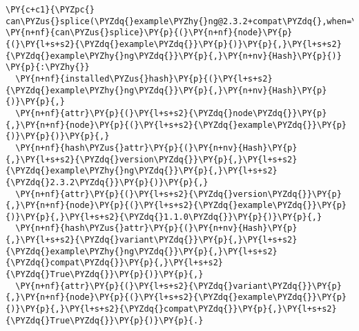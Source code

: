 \begin{Verbatim}[commandchars=\\\{\},fontsize=\footnotesize]
\PY{c+c1}{\PYZpc{} can\PYZus{}splice(\PYZdq{}example\PYZhy{}ng@2.3.2+compat\PYZdq{},when=\PYZdq{}@1.1.0+compat)}
\PY{n+nf}{can\PYZus{}splice}\PY{p}{(}\PY{n+nf}{node}\PY{p}{(}\PY{l+s+s2}{\PYZdq{}example\PYZdq{}}\PY{p}{)}\PY{p}{,}\PY{l+s+s2}{\PYZdq{}example\PYZhy{}ng\PYZdq{}}\PY{p}{,}\PY{n+nv}{Hash}\PY{p}{)} \PY{p}{:\PYZhy{}}
  \PY{n+nf}{installed\PYZus{}hash}\PY{p}{(}\PY{l+s+s2}{\PYZdq{}example\PYZhy{}ng\PYZdq{}}\PY{p}{,}\PY{n+nv}{Hash}\PY{p}{)}\PY{p}{,}
  \PY{n+nf}{attr}\PY{p}{(}\PY{l+s+s2}{\PYZdq{}node\PYZdq{}}\PY{p}{,}\PY{n+nf}{node}\PY{p}{(}\PY{l+s+s2}{\PYZdq{}example\PYZdq{}}\PY{p}{)}\PY{p}{)}\PY{p}{,}
  \PY{n+nf}{hash\PYZus{}attr}\PY{p}{(}\PY{n+nv}{Hash}\PY{p}{,}\PY{l+s+s2}{\PYZdq{}version\PYZdq{}}\PY{p}{,}\PY{l+s+s2}{\PYZdq{}example\PYZhy{}ng\PYZdq{}}\PY{p}{,}\PY{l+s+s2}{\PYZdq{}2.3.2\PYZdq{}}\PY{p}{)}\PY{p}{,}
  \PY{n+nf}{attr}\PY{p}{(}\PY{l+s+s2}{\PYZdq{}version\PYZdq{}}\PY{p}{,}\PY{n+nf}{node}\PY{p}{(}\PY{l+s+s2}{\PYZdq{}example\PYZdq{}}\PY{p}{)}\PY{p}{,}\PY{l+s+s2}{\PYZdq{}1.1.0\PYZdq{}}\PY{p}{)}\PY{p}{,}
  \PY{n+nf}{hash\PYZus{}attr}\PY{p}{(}\PY{n+nv}{Hash}\PY{p}{,}\PY{l+s+s2}{\PYZdq{}variant\PYZdq{}}\PY{p}{,}\PY{l+s+s2}{\PYZdq{}example\PYZhy{}ng\PYZdq{}}\PY{p}{,}\PY{l+s+s2}{\PYZdq{}compat\PYZdq{}}\PY{p}{,}\PY{l+s+s2}{\PYZdq{}True\PYZdq{}}\PY{p}{)}\PY{p}{,}
  \PY{n+nf}{attr}\PY{p}{(}\PY{l+s+s2}{\PYZdq{}variant\PYZdq{}}\PY{p}{,}\PY{n+nf}{node}\PY{p}{(}\PY{l+s+s2}{\PYZdq{}example\PYZdq{}}\PY{p}{)}\PY{p}{,}\PY{l+s+s2}{\PYZdq{}compat\PYZdq{}}\PY{p}{,}\PY{l+s+s2}{\PYZdq{}True\PYZdq{}}\PY{p}{)}\PY{p}{.}
\end{Verbatim}
